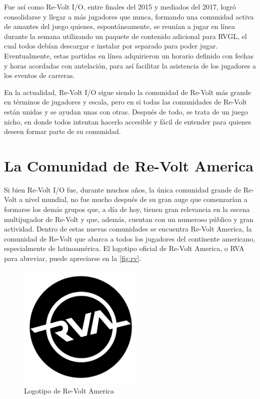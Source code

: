 Fue así como Re-Volt I/O, entre finales del 2015 y mediados del 2017, logró consolidarse y llegar a más jugadores que nunca, formando una comunidad activa de amantes del juego quienes, espontáneamente, se reunían a jugar en línea durante la semana utilizando un paquete de contenido adicional para RVGL, el cual todos debían descargar e instalar por separado para poder jugar. Eventualmente, estas partidas en línea adquirieron un horario definido con fechas y horas acordadas con antelación, para así facilitar la asistencia de los jugadores a los eventos de carreras.

En la actualidad, Re-Volt I/O sigue siendo la comunidad de Re-Volt más grande en términos de jugadores y escala, pero en si todas las comunidades de Re-Volt están unidas y se ayudan unas con otras. Después de todo, se trata de un juego nicho, en donde todos intentan hacerlo accesible y fácil de entender para quienes deseen formar parte de su comunidad.

\section{La Comunidad de Re-Volt America}
Si bien Re-Volt I/O fue, durante muchos años, la única comunidad grande de Re-Volt a nivel mundial, no fue mucho después de su gran auge que comenzarían a formarse los demás grupos que, a día de hoy, tienen gran relevancia en la escena multijugador de Re-Volt y que, además, cuentan con un numeroso público y gran actividad. Dentro de estas nuevas comunidades se encuentra Re-Volt America, la comunidad de Re-Volt que abarca a todos los jugadores del continente americano, especialmente de latinoamérica. El logotipo oficial de Re-Volt America, o RVA para abreviar, puede apreciarse en la \autoref{fig:rv}.


\begin{figure}[H]
  \begin{center}
    \includegraphics[width=6cm, height=6cm]{img/rva.png}
  \end{center}
  \caption[Logotipo de Re-Volt America]{Logotipo de Re-Volt America}
  \label{fig:rva}
\end{figure}

